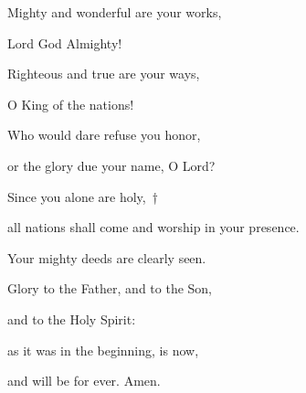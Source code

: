 \noindent Mighty and wonderful are your works,~\GreStar{}~\nopagebreak

Lord God Almighty!

\noindent Righteous and true are your ways,~\GreStar{}~\nopagebreak

O King of the nations!

\noindent Who would dare refuse you honor,~\GreStar{}~\nopagebreak

or the glory due your name, O Lord?

\noindent Since you alone are holy,~†~\nopagebreak

all nations shall come and worship in your presence.~\GreStar{}~\nopagebreak

Your mighty deeds are clearly seen.

\noindent Glory to the Father, and to the Son,~\GreStar{}~\nopagebreak

and to the Holy Spirit:

\noindent as it was in the beginning, is now,~\GreStar{}~\nopagebreak

and will be for ever. Amen.
